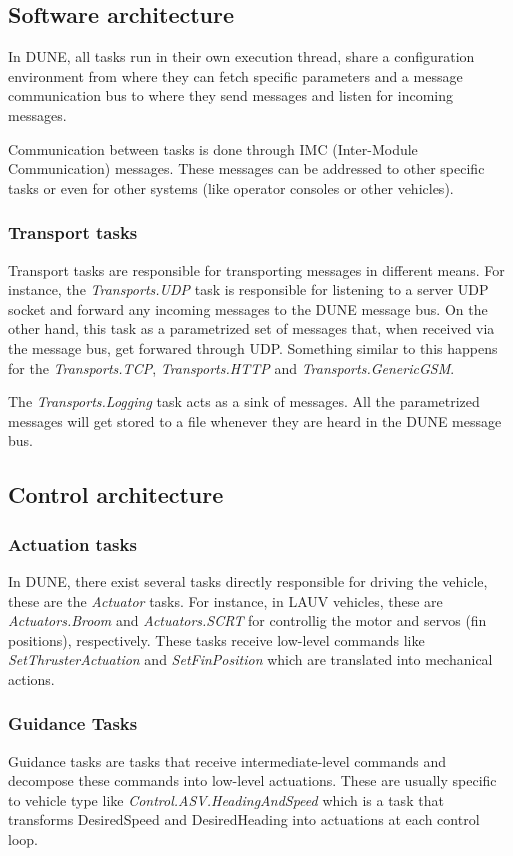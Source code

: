 \documentclass{article}
\begin{document}
\subsection{Software architecture}
In DUNE, all tasks run in their own execution thread, share a configuration
environment from where they can fetch specific parameters and a message
communication bus to where they send messages and listen for incoming messages. 

Communication between tasks is done through IMC (Inter-Module Communication)
messages. These messages can be addressed to other specific tasks or even for
other systems (like operator consoles or other vehicles).

\subsubsection{Transport tasks}
Transport tasks are responsible for transporting messages in different means.
For instance, the \emph{Transports.UDP} task is responsible for listening to a
server UDP socket and forward any incoming messages to the DUNE message bus. On
the other hand, this task as a parametrized set of messages that, when received
via the message bus, get forwared through UDP. Something similar to this happens
for the \emph{Transports.TCP},  \emph{Transports.HTTP} and
\emph{Transports.GenericGSM}.

The \emph{Transports.Logging} task acts as a sink of messages. All the
parametrized messages will get stored to a file whenever they are heard in the
DUNE message bus.

\subsection{Control architecture}

\subsubsection{Actuation tasks}
In DUNE, there exist several tasks directly responsible for driving the
vehicle, these are the \emph{Actuator} tasks. For instance, in LAUV vehicles, these are
\emph{Actuators.Broom} and \emph{Actuators.SCRT} for controllig the motor and
servos (fin positions), respectively. These tasks receive low-level commands
like \emph{SetThrusterActuation} and \emph{SetFinPosition} which are translated
into mechanical actions.

\subsubsection{Guidance Tasks}
Guidance tasks are tasks that receive intermediate-level commands and decompose
these commands into low-level actuations. These are usually specific to vehicle
type like \emph{Control.ASV.HeadingAndSpeed} which is a task that transforms
DesiredSpeed and DesiredHeading into actuations at each control loop.
\end{document}
